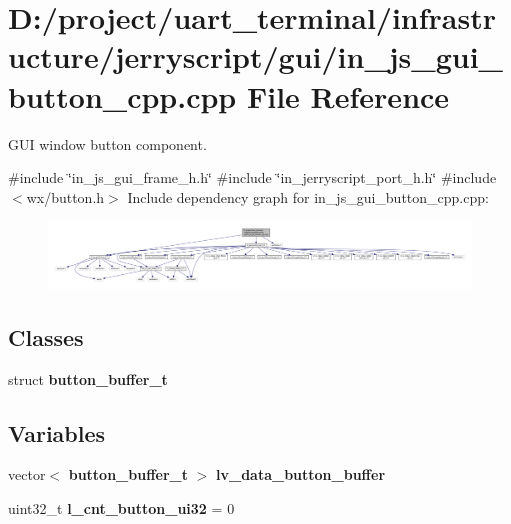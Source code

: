\section{D\+:/project/uart\+\_\+terminal/infrastructure/jerryscript/gui/in\+\_\+js\+\_\+gui\+\_\+button\+\_\+cpp.cpp File Reference}
\label{in__js__gui__button__cpp_8cpp}


G\+UI window button component.  


{\ttfamily \#include \char`\"{}in\+\_\+js\+\_\+gui\+\_\+frame\+\_\+h.\+h\char`\"{}}\newline
{\ttfamily \#include \char`\"{}in\+\_\+jerryscript\+\_\+port\+\_\+h.\+h\char`\"{}}\newline
{\ttfamily \#include $<$wx/button.\+h$>$}\newline
Include dependency graph for in\+\_\+js\+\_\+gui\+\_\+button\+\_\+cpp.\+cpp\+:
\nopagebreak
\begin{figure}[H]
\begin{center}
\leavevmode
\includegraphics[width=350pt]{in__js__gui__button__cpp_8cpp__incl}
\end{center}
\end{figure}
\subsection*{Classes}
\begin{DoxyCompactItemize}
\item 
struct \textbf{ button\+\_\+buffer\+\_\+t}
\end{DoxyCompactItemize}
\subsection*{Variables}
\begin{DoxyCompactItemize}
\item 
vector$<$ \textbf{ button\+\_\+buffer\+\_\+t} $>$ \textbf{ lv\+\_\+data\+\_\+button\+\_\+buffer}
\item 
uint32\+\_\+t {\bfseries l\+\_\+cnt\+\_\+button\+\_\+ui32} = 0
\end{DoxyCompactItemize}


